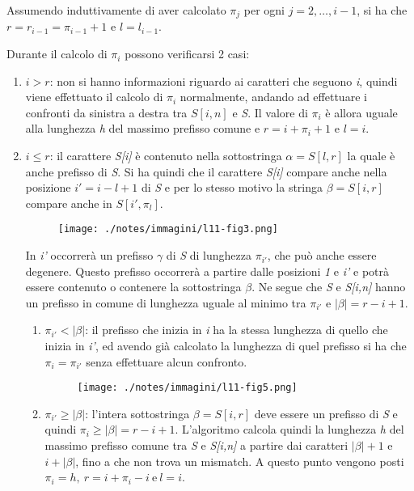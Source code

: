Assumendo induttivamente di aver calcolato $ \pi_j $ per ogni $ j = 2, \ldots, i-1$, si ha che $ r = r_{i-1} = \pi_{i-1} +1 $ e $ l = l_{i-1} $.

Durante il calcolo di $ \pi_i $ possono verificarsi 2 casi:

\begin{enumerate}
	\item $ i > r $: non si hanno informazioni riguardo ai caratteri che seguono \textit{i}, quindi viene effettuato il calcolo di $ \pi_i $ normalmente, andando ad effettuare i confronti da sinistra a destra tra $ S[i,n] $ e \textit{S}. Il valore di $ \pi_i $ è allora uguale alla lunghezza \textit{h} del massimo prefisso comune e $ r = i  + \pi_i +1 $ e $ l= i $.
	\item $ i \leq r$: il carattere \textit{S[i]} è contenuto nella sottostringa $ \alpha = S[l,r] $ la quale è anche prefisso di \textit{S}. Si ha quindi che il carattere \textit{S[i]} compare anche nella posizione $ i' = i - l +1 $ di \textit{S} e per lo stesso motivo la stringa $ \beta = S[i,r] $ compare anche in $ S[i', \pi_l] $.
	\begin{figure}[htbp]
		\centering
		\texttt{[image: ./notes/immagini/l11-fig3.png]}
	\end{figure}
	In \textit{i'} occorrerà un prefisso $ \gamma $ di \textit{S} di lunghezza $ \pi_{i'} $, che può anche essere degenere.
	Questo prefisso occorrerà a partire dalle posizioni \textit{1} e \textit{i'} e potrà essere contenuto o contenere la sottostringa $ \beta $.
	Ne segue che \textit{S} e \textit{S[i,n]} hanno un prefisso in comune di lunghezza uguale al minimo tra $ \pi_{i'} $ e $ |\beta| = r - i +1 $.
	\begin{enumerate}
		\item $ \pi_{i'} < |\beta| $: il prefisso che inizia in \textit{i} ha la stessa lunghezza di quello che inizia in \textit{i'}, ed avendo già calcolato la lunghezza di quel prefisso si ha che $ \pi_i = \pi_{i'} $ senza effettuare alcun confronto.
		\begin{figure}[htbp]
			\centering
			\texttt{[image: ./notes/immagini/l11-fig5.png]}
		\end{figure}
		\item $ \pi_{i'} \geq |\beta|$: l'intera sottostringa $ \beta = S[i,r] $ deve essere un prefisso di \textit{S} e quindi $\pi_i \geq |\beta| = r - i +1$. L'algoritmo calcola quindi la lunghezza \textit{h} del massimo prefisso comune tra \textit{S} e \textit{S[i,n]} a partire dai caratteri $ |\beta| + 1 $ e $ i + |\beta| $, fino a che non trova un mismatch. A questo punto vengono posti $ \pi_i =h,\: r= i + \pi_i -i \: \text{e} \: l = i $.
	\end{enumerate}
	
\end{enumerate}

